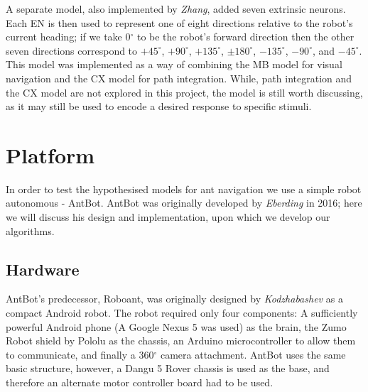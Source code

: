 \documentclass[a4paper,12pt]{article}
\begin{document}
A separate model, also implemented by \textit{Zhang}, added seven extrinsic neurons. Each EN is then
used to represent one of eight directions relative to the robot's current heading; if we take 0$^\circ$
to be the robot's forward direction then the other seven directions correspond to $+45^\circ$,
$+90^\circ$, $+135^\circ$, $\pm180^\circ$, $-135^\circ$, $-90^\circ$, and $-45^\circ$. This model was implemented as a way of
combining the MB model for visual navigation and the CX model for path integration. While, path
integration and the CX model are not explored in this project, the model is still worth discussing,
as it may still be used to encode a desired response to specific stimuli.


\newpage

\section{ Platform } \label{sec:platform}
In order to test the hypothesised models for ant navigation we use a simple robot autonomous - AntBot.
AntBot was originally developed by \textit{Eberding} in 2016; here we will discuss his design and
implementation, upon which we develop our algorithms.

\subsection{ Hardware }
AntBot's predecessor, Roboant, was originally designed by \textit{Kodzhabashev} \cite{Kodzhabashev2014}
as a compact Android robot. The robot required only four components: A sufficiently powerful Android
phone (A Google Nexus 5 was used) as the brain, the Zumo Robot shield by Pololu as the chassis,
an Arduino microcontroller to allow them to communicate, and finally a 360$^{\circ}$ camera attachment.
AntBot uses the same basic structure, however, a Dangu 5 Rover chassis is used as the base, and
therefore an alternate motor controller board had to be used.
\newline
\end{document}
